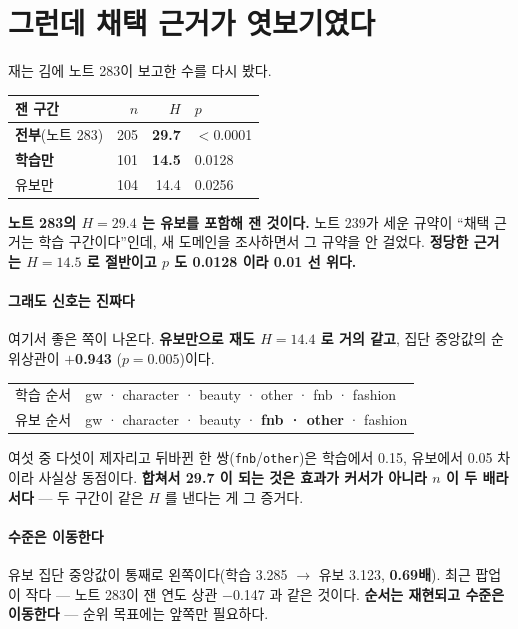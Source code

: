 \documentclass[10pt]{article}
\begin{document}
\section{그런데 채택 근거가 엿보기였다}

재는 김에 노트 283이 보고한 수를 다시 봤다.

\begin{center}\small
\begin{tabular}{lrrl}
\hline
잰 구간 & $n$ & $H$ & $p$ \\
\hline
\textbf{전부}(노트 283) & 205 & \textbf{29.7} & $<$0.0001 \\
\textbf{학습만} & 101 & \textbf{14.5} & 0.0128 \\
유보만 & 104 & 14.4 & 0.0256 \\
\hline
\end{tabular}
\end{center}

\textbf{노트 283의 $H{=}29.4$ 는 유보를 포함해 잰 것이다.} 노트 239가 세운
규약이 ``채택 근거는 학습 구간이다''인데, 새 도메인을 조사하면서 그 규약을
안 걸었다. \textbf{정당한 근거는 $H{=}14.5$ 로 절반이고 $p$ 도 0.0128 이라
0.01 선 위다.}

\paragraph{그래도 신호는 진짜다} 여기서 좋은 쪽이 나온다. \textbf{유보만으로
재도 $H{=}14.4$ 로 거의 같고}, 집단 중앙값의 순위상관이 \textbf{$+$0.943}
($p{=}0.005$)이다.

\begin{center}\small
\begin{tabular}{ll}
\hline
학습 순서 & gw · character · beauty · other · fnb · fashion \\
유보 순서 & gw · character · beauty · \textbf{fnb · other} · fashion \\
\hline
\end{tabular}
\end{center}

여섯 중 다섯이 제자리고 뒤바뀐 한 쌍(\texttt{fnb}/\texttt{other})은 학습에서
0.15, 유보에서 0.05 차이라 사실상 동점이다. \textbf{합쳐서 29.7 이 되는 것은
효과가 커서가 아니라 $n$ 이 두 배라서다} --- 두 구간이 같은 $H$ 를 낸다는 게
그 증거다.

\paragraph{수준은 이동한다} 유보 집단 중앙값이 통째로 왼쪽이다(학습 3.285
$\to$ 유보 3.123, \textbf{0.69배}). 최근 팝업이 작다 --- 노트 283이 잰 연도
상관 $-$0.147 과 같은 것이다. \textbf{순서는 재현되고 수준은 이동한다} ---
순위 목표에는 앞쪽만 필요하다.
\end{document}
